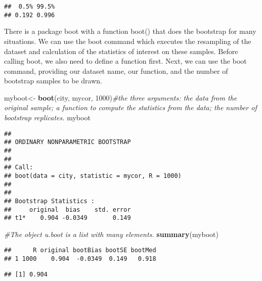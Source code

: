 \documentclass[]{book}
\newenvironment{Shaded}{\begin{snugshade}}{\end{snugshade}}
\newcommand{\KeywordTok}[1]{\textcolor[rgb]{0.13,0.29,0.53}{\textbf{#1}}}
\newcommand{\DecValTok}[1]{\textcolor[rgb]{0.00,0.00,0.81}{#1}}
\newcommand{\StringTok}[1]{\textcolor[rgb]{0.31,0.60,0.02}{#1}}
\newcommand{\CommentTok}[1]{\textcolor[rgb]{0.56,0.35,0.01}{\textit{#1}}}
\newcommand{\OperatorTok}[1]{\textcolor[rgb]{0.81,0.36,0.00}{\textbf{#1}}}
\newcommand{\NormalTok}[1]{#1}
\theoremstyle{definition}
\theoremstyle{definition}
\theoremstyle{definition}
\theoremstyle{remark}
\begin{document}
\begin{verbatim}
##  0.5% 99.5% 
## 0.192 0.996
\end{verbatim}

There is a package boot with a function boot() that does the bootstrap
for many situations. We can use the boot command which executes the
resampling of the dataset and calculation of the statistics of interest
on these samples. Before calling boot, we also need to define a function
first. Next, we can use the boot command, providing our dataset name,
our function, and the number of bootstrap samples to be drawn.

\begin{Shaded}
\begin{Highlighting}[]
\NormalTok{myboot<-}\StringTok{ }\KeywordTok{boot}\NormalTok{(city, mycor, }\DecValTok{1000}\NormalTok{)}\CommentTok{#the three arguments: the data from the original sample; a function to compute the statistics from the data; the number of bootstrap replicates.}
\NormalTok{myboot}
\end{Highlighting}
\end{Shaded}

\begin{verbatim}
## 
## ORDINARY NONPARAMETRIC BOOTSTRAP
## 
## 
## Call:
## boot(data = city, statistic = mycor, R = 1000)
## 
## 
## Bootstrap Statistics :
##     original  bias    std. error
## t1*    0.904 -0.0349       0.149
\end{verbatim}

\begin{Shaded}
\begin{Highlighting}[]
\CommentTok{#The object u.boot is a list with many elements. }
\KeywordTok{summary}\NormalTok{(myboot)}
\end{Highlighting}
\end{Shaded}

\begin{verbatim}
##      R original bootBias bootSE bootMed
## 1 1000    0.904  -0.0349  0.149   0.918
\end{verbatim}

\begin{Shaded}
\end{Shaded}

\begin{verbatim}
## [1] 0.904
\end{verbatim}
\end{document}
